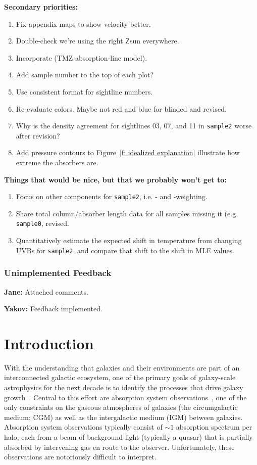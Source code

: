 \documentclass[fleqn,usenatbib]{mnras}
\begin{document}
\textbf{Secondary priorities:}
\begin{enumerate}
\item Fix appendix maps to show velocity better.
    \item Double-check we're using the right Zsun everywhere.
    \item Incorporate \cite{tan2021Model} (TMZ absorption-line model).
    \item Add sample number to the top of each plot?
    \item Use consistent format for sightline numbers.
    \item Re-evaluate colors. Maybe not red and blue for blinded and revised.
    \item Why is the density agreement for sightlines 03, 07, and 11 in \texttt{sample2} worse after revision?
    \item Add pressure contours to Figure~\ref{f: idealized explanation} illustrate how extreme the absorbers are.
\end{enumerate}

\textbf{Things that would be nice, but that we probably won't get to:}
\begin{enumerate}
    \item Focus on other components for \texttt{sample2}, i.e. - and -weighting.
    \item Share total column/absorber length data for all samples missing it (e.g. \texttt{sample0}, revised.
    \item Quantitatively estimate the expected shift in temperature from changing UVBs for \texttt{sample2}, and compare that shift to the shift in MLE values.
\end{enumerate}

\subsubsection{Unimplemented Feedback}

\textbf{Jane:}
Attached comments.

\textbf{Yakov:}
Feedback implemented.

\section{Introduction}

With the understanding that galaxies and their environments are part of an interconnected galactic ecosystem, one of the primary goals of galaxy-scale astrophysics for the next decade is to identify the processes that drive galaxy growth~\citep{Decadal2020}.
Central to this effort are absorption system observations~\citep[e.g.][]{bahcall1993Hubble, lanzetta1995Gaseous, lauroesch1996QSO, churchill1996Spatial}, one of the only constraints on the gaseous atmospheres of galaxies (the circumgalactic medium; CGM) as well as the intergalactic medium (IGM) between galaxies.
Absorption system observations typically consist of $\sim 1$ absorption spectrum per halo, each from a beam of background light (typically a quasar) that is partially absorbed by intervening gas en route to the observer.
Unfortunately, these observations are notoriously difficult to interpret.
\end{document}
